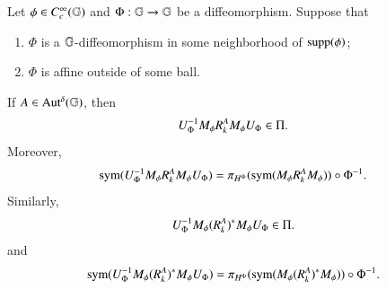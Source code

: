 \documentclass[leqno]{amsart}
\begin{document}
	
	\begin{lemma}\label{rieszpi}
		Let $\phi\in C_{c}^{\infty}(\mathbb{G})$ and $\Phi:\mathbb{G}\rightarrow \mathbb{G}$ be a diffeomorphism. 
		Suppose that
		\begin{enumerate}
			\item $\Phi$ is a $\mathbb{G}$-diffeomorphism in some neighborhood of ${\rm supp}(\phi)$;
			
			\item $\Phi$ is affine outside of some ball.
			
			
		\end{enumerate}
		If $A\in{\rm Aut^{\delta}}(\mathbb{G})$, then
		\begin{align*}
			U_{\Phi}^{-1} M_{\phi}{ R}^{A}_{k}M_{\phi}U_{\Phi}\in\Pi.
		\end{align*}
		Moreover,
		\begin{align*}
			{\rm sym}(U_{\Phi}^{-1} M_{\phi}{ R}^{A}_{k}M_{\phi}U_{\Phi})=\pi_{H^{\Phi}}({\rm sym}(M_{\phi}{ R}^{A}_{k}M_{\phi}))\circ\Phi^{-1}.
		\end{align*}
		Similarly,
		\begin{align*}
			U_{\Phi}^{-1} M_{\phi}({ R}^{A}_{k})^{*}M_{\phi}U_{\Phi}\in\Pi.
		\end{align*}
		and
		\begin{align*}
			{\rm sym}(U_{\Phi}^{-1} M_{\phi}({ R}^{A}_{k})^{*}M_{\phi}U_{\Phi})
			=\pi_{H^{\Phi}}({\rm sym}(M_{\phi}({ R}^{A}_{k})^{*}M_{\phi}))\circ\Phi^{-1}.
		\end{align*}
	\end{lemma}
\end{document}
